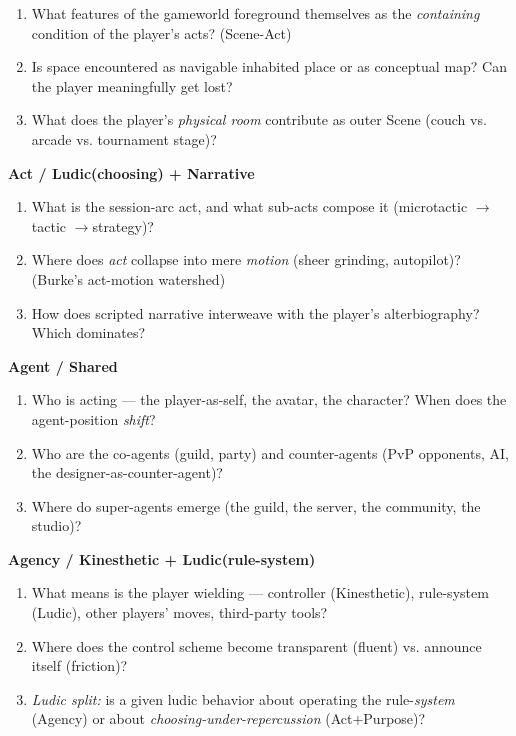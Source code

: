 \documentclass[11pt]{report}
\begin{document}
\begin{enumerate}
\item What features of the gameworld foreground themselves as the \textit{containing} condition of the player's acts? (Scene-Act)
\item Is space encountered as navigable inhabited place or as conceptual map? Can the player meaningfully get lost?
\item What does the player's \textit{physical room} contribute as outer Scene (couch vs. arcade vs. tournament stage)?
\end{enumerate}


\textbf{Act / Ludic(choosing) + Narrative}

\begin{enumerate}
\item What is the session-arc act, and what sub-acts compose it (microtactic $\rightarrow$\allowbreak  tactic $\rightarrow$\allowbreak  strategy)?
\item Where does \textit{act} collapse into mere \textit{motion} (sheer grinding, autopilot)? (Burke's act-motion watershed)
\item How does scripted narrative interweave with the player's alterbiography? Which dominates?
\end{enumerate}


\textbf{Agent / Shared}

\begin{enumerate}
\item Who is acting — the player-as-self, the avatar, the character? When does the agent-position \textit{shift}?
\item Who are the co-agents (guild, party) and counter-agents (PvP opponents, AI, the designer-as-counter-agent)?
\item Where do super-agents emerge (the guild, the server, the community, the studio)?
\end{enumerate}


\textbf{Agency / Kinesthetic + Ludic(rule-system)}

\begin{enumerate}
\item What means is the player wielding — controller (Kinesthetic), rule-system (Ludic), other players' moves, third-party tools?
\item Where does the control scheme become transparent (fluent) vs. announce itself (friction)?
\item \textit{Ludic split:} is a given ludic behavior about operating the rule-\textit{system} (Agency) or about \textit{choosing-under-repercussion} (Act+Purpose)?
\end{enumerate}
\end{document}
